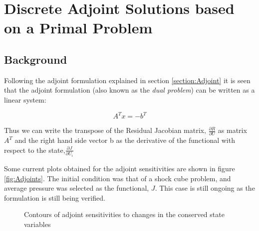 \section{Discrete Adjoint Solutions based on a Primal Problem}
\label{section:Discrete_Adjoint}
\subsection{Background}

Following the adjoint formulation explained in section \ref{section:Adjoint} it is seen that the adjoint formulation (also known as the \textit{dual problem}) can be written as a linear system:

\begin{equation}
A^Tx = -b^T
\end{equation}

Thus we can write the transpose of the Residual Jacobian matrix, $\frac{\partial{R}}{\partial{U}}$ as matrix $A^T$ and the right hand side vector b as the derivative of the functional with respect to the state,$\frac{\partial{J}}{\partial{U_i}}$\par

Some current plots obtained for the adjoint sensitivities are shown in figure \ref{fig:Adjoints}. The initial condition was that of a shock cube problem, and average pressure was selected as the functional, $J$. This case is still ongoing as the formulation is still being verified.\par

\begin{figure}[t!]
  \centering
   \:
	\:
   \:
   \caption{Contours of adjoint sensitivities to changes in the conserved state variables } 
\label{Adjoints}      
\end{figure}  